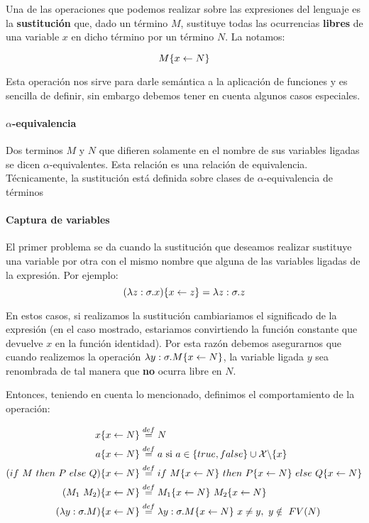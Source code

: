 Una de las operaciones que podemos realizar sobre las expresiones del lenguaje es la \textbf{sustitución} que, dado un término $M$, sustituye todas las ocurrencias \textbf{libres} de una variable $x$ en dicho término por un término $N$. La notamos:

$$M\{x\leftarrow N\}$$

Esta operación nos sirve para darle semántica a la aplicación de funciones y es sencilla de definir, sin embargo debemos tener en cuenta algunos casos especiales.

\paragraph{$\alpha$-equivalencia} Dos terminos $M$ y $N$ que difieren solamente en el nombre de sus variables ligadas se dicen $\alpha$-equivalentes. Esta relación es una relación de equivalencia. Técnicamente, la sustitución está definida sobre clases de $\alpha$-equivalencia de términos


\paragraph{Captura de variables}\label{calculo_lambda:captura_variables} El primer problema se da cuando la sustitución que deseamos realizar sustituye una variable por otra con el mismo nombre que alguna de las variables ligadas de la expresión. Por ejemplo:
$$(\lambda z: \sigma . x)\{x\leftarrow z\} = \lambda z: \sigma . z$$

En estos casos, si realizamos la sustitución cambiariamos el significado de la expresión (en el caso mostrado, estariamos convirtiendo la función constante que devuelve $x$ en la función identidad). Por esta razón debemos asegurarnos que cuando realizemos la operación $\lambda y: \sigma . M\{x\leftarrow N\}$, la variable ligada $y$ sea renombrada de tal manera que \textbf{no} ocurra libre en $N$.

\vspace*{5mm}
Entonces, teniendo en cuenta lo mencionado, definimos el comportamiento de la operación:

\begin{equation*}
\begin{split}
x\{x\leftarrow N\} &\overset{def}{=} N \\
a\{x\leftarrow N\} &\overset{def}{=} a \text{ si } a \in \{true,false\}\cup\mathcal{X}\backslash\{x\} \\
(if~ M~ then~ P~ else~ Q)\{x\leftarrow N\} &\overset{def}{=} if~ M\{x\leftarrow N\}~ then~ P\{x\leftarrow N\}~ else~ Q\{x\leftarrow N\}\\
(M_1~M_2)\{x\leftarrow N\} &\overset{def}{=} M_1\{x\leftarrow N\}~M_2\{x\leftarrow N\}\\
(\lambda y: \sigma . M)\{x\leftarrow N\} &\overset{def}{=} \lambda y: \sigma . M\{x\leftarrow N\}~x\neq y,~y\notin~FV(N)
\end{split}
\end{equation*}

